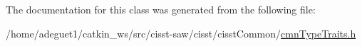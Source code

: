 The documentation for this class was generated from the following file\-:\begin{DoxyCompactItemize}
\item 
/home/adeguet1/catkin\-\_\-ws/src/cisst-\/saw/cisst/cisst\-Common/\hyperlink{cmn_type_traits_8h}{cmn\-Type\-Traits.\-h}\end{DoxyCompactItemize}
